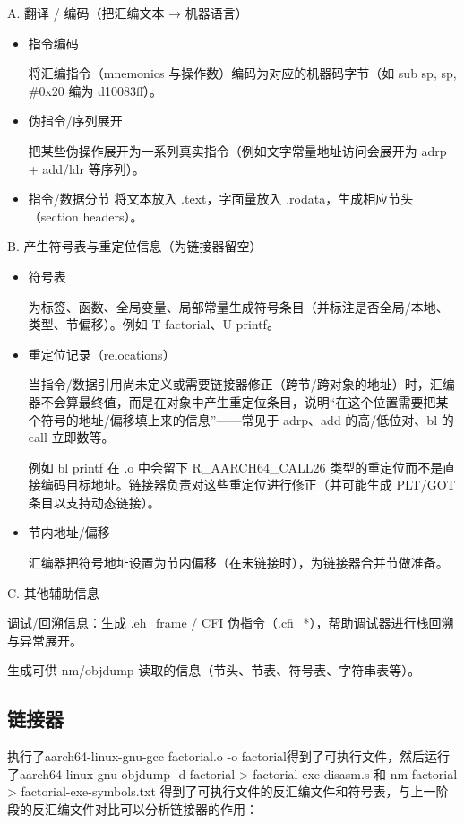 \documentclass[a4paper]{article}
\begin{document}
A. 翻译 / 编码（把汇编文本 → 机器语言）
\begin{itemize}
	\item 指令编码 
	
	将汇编指令（mnemonics 与操作数）编码为对应的机器码字节（如 sub sp, sp, \#0x20 编为 d10083ff）。
	\item 伪指令/序列展开
	
	把某些伪操作展开为一系列真实指令（例如文字常量地址访问会展开为 adrp + add/ldr 等序列）。
	\item 指令/数据分节
	 将文本放入 .text，字面量放入 .rodata，生成相应节头（section headers）。
\end{itemize}

B. 产生符号表与重定位信息（为链接器留空）
\begin{itemize}
	\item 符号表
	
	为标签、函数、全局变量、局部常量生成符号条目（并标注是否全局/本地、类型、节偏移）。例如 T factorial、U printf。
	\item 重定位记录（relocations）
	
	当指令/数据引用尚未定义或需要链接器修正（跨节/跨对象的地址）时，汇编器不会算最终值，而是在对象中产生重定位条目，说明“在这个位置需要把某个符号的地址/偏移填上来的信息”——常见于 adrp、add 的高/低位对、bl 的 call 立即数等。
	
	例如 bl printf 在 .o 中会留下 R\_AARCH64\_CALL26 类型的重定位而不是直接编码目标地址。链接器负责对这些重定位进行修正（并可能生成 PLT/GOT 条目以支持动态链接）。
	\item 节内地址/偏移 
	
	汇编器把符号地址设置为节内偏移（在未链接时），为链接器合并节做准备。
\end{itemize}

C. 其他辅助信息

调试/回溯信息：生成 .eh\_frame / CFI 伪指令（.cfi\_*），帮助调试器进行栈回溯与异常展开。

生成可供 nm/objdump 读取的信息（节头、节表、符号表、字符串表等）。


\subsection{链接器}

执行了aarch64-linux-gnu-gcc factorial.o -o factorial得到了可执行文件，然后运行了aarch64-linux-gnu-objdump -d factorial > factorial-exe-disasm.s 和 nm factorial > factorial-exe-symbols.txt
得到了可执行文件的反汇编文件和符号表，与上一阶段的反汇编文件对比可以分析链接器的作用：
\end{document}
